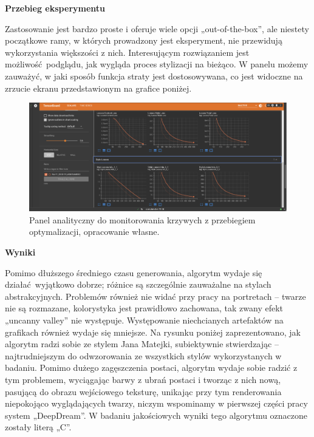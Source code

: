 \documentclass[12pt]{article}
\begin{document}
\noindent\textbf{Przebieg eksperymentu}

Zastosowanie jest bardzo proste i oferuje wiele opcji „out-of-the-box”, ale niestety początkowe ramy, w których prowadzony jest eksperyment, nie przewidują wykorzystania większości z nich. Interesującym rozwiązaniem jest możliwość podglądu, jak wygląda proces stylizacji na bieżąco. W panelu możemy zauważyć, w jaki sposób funkcja straty jest dostosowywana, co jest widoczne na zrzucie ekranu przedstawionym na grafice poniżej.
\begin{figure}[H]
    \centering
    \includegraphics[width=\textwidth]{u16.png}
    \caption{Panel analityczny do monitorowania krzywych z przebiegiem optymalizacji, opracowanie własne.}
    \label{fig:12}
\end{figure}

\noindent\textbf{Wyniki}

Pomimo dłuższego średniego czasu generowania, algorytm wydaje się działać wyjątkowo dobrze; różnice są szczególnie zauważalne na stylach abstrakcyjnych. Problemów również nie widać przy pracy na portretach – twarze nie są rozmazane, kolorystyka jest prawidłowo zachowana, tak zwany efekt „uncanny valley” nie występuje. Występowanie niechcianych artefaktów na grafikach również wydaje się mniejsze. Na rysunku poniżej zaprezentowano, jak algorytm radzi sobie ze stylem Jana Matejki, subiektywnie stwierdzając – najtrudniejszym do odwzorowania ze wszystkich stylów wykorzystanych w badaniu. Pomimo dużego zagęszczenia postaci, algorytm wydaje sobie radzić z tym problemem, wyciągając barwy z ubrań postaci i tworząc z nich nową, pasującą do obrazu wejściowego teksturę, unikając przy tym renderowania niepokojąco wyglądających twarzy, niczym wspominamy w pierwszej części pracy system „DeepDream”. W badaniu jakościowych wyniki tego algorytmu oznaczone zostały literą „C”.
\end{document}
